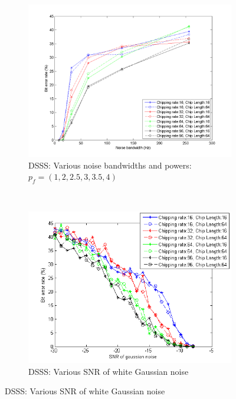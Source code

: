 			\begin{figure}[H]
				\centering
				\caption{}
				\begin{subfigure}[b]{0.5\textwidth}
					\includegraphics[width=\textwidth]{imgs/results/plot_mode_dsss-test_bandwidthAndPower-rep_20-dataRate_8-dataLength_128.png}
					\caption{DSSS: Various noise bandwidths and powers: $p_f = (1,2,2.5,3,3.5,4)$}
					\label{fig:dsss_bandwidth}
				\end{subfigure}%
				~
				\begin{subfigure}[b]{0.5\textwidth}
					\includegraphics[width=\textwidth]{imgs/results/plot_mode_dsss-test_gaussianSNR-rep_20-dataRate_8-dataLength_128_fixedlegend.png}
					\caption{DSSS: Various SNR of white Gaussian noise}
					\label{fig:dsss_gaussian}
				\end{subfigure}
			\end{figure}		
				
